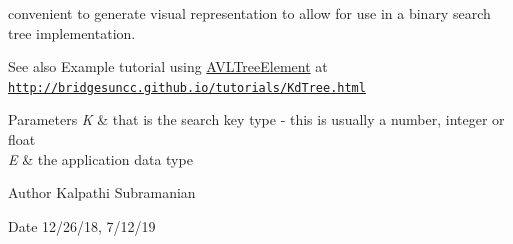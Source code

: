 convenient to generate visual representation to allow for use in a binary search tree implementation.

\begin{DoxySeeAlso}{See also}
Example tutorial using \hyperlink{classbridges_1_1base_1_1_a_v_l_tree_element}{A\+V\+L\+Tree\+Element} at \href{http://bridgesuncc.github.io/tutorials/KdTree.html}{\tt http\+://bridgesuncc.\+github.\+io/tutorials/\+Kd\+Tree.\+html}
\end{DoxySeeAlso}

\begin{DoxyParams}{Parameters}
{\em K} & that is the search key type -\/ this is usually a number, integer or float \\
\hline
{\em E} & the application data type\\
\hline
\end{DoxyParams}
\begin{DoxyAuthor}{Author}
Kalpathi Subramanian 
\end{DoxyAuthor}
\begin{DoxyDate}{Date}
12/26/18, 7/12/19 
\end{DoxyDate}
